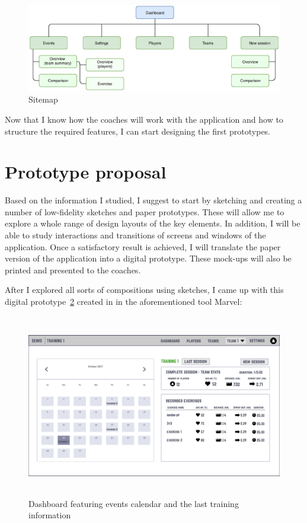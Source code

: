 \begin{figure}[htb]
\begin{center}
  \includegraphics*[width=14cm,keepaspectratio,trim={0 14cm 0 6cm}]{images/sitemap}
\end{center}
\caption{Sitemap}
\label{img:sitemap}
\end{figure}

Now that I know how the coaches will work with the application and how to structure the required features, I can start designing the first prototypes.

\section{Prototype proposal}
Based on the information I studied, I suggest to start by sketching and creating a number of low-fidelity sketches and paper prototypes. These will allow me to explore a whole range of design layouts of the key elements. In addition, I will be able to study interactions and transitions of screens and windows of the application.
Once a satisfactory result is achieved, I will translate the paper version of the application into a digital prototype. These mock-ups will also be printed and presented to the coaches.

After I explored all sorts of compositions using sketches, I came up with this digital prototype~\ref{img:dashboard} created in in the aforementioned tool Marvel:

\begin{figure}[htb]
\begin{center}
  \includegraphics*[width=14cm,height=8cm,keepaspectratio]{images/dashboard}
\end{center}
\caption{Dashboard featuring events calendar and the last training information}
\label{img:dashboard}
\end{figure}

